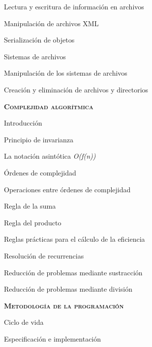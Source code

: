 \begin{longenum}
\begin{longenum}
\begin{longenum}
            \item Lectura y escritura de información en archivos
        \end{longenum}
        \item Manipulación de archivos XML
        \item Serialización de objetos
        \item Sistemas de archivos
        \begin{longenum}
            \item Manipulación de los sistemas de archivos
            \item Creación y eliminación de archivos y directorios
        \end{longenum}
    \end{longenum}
    \item \textbf{\textsc{Complejidad algorítmica}} \opcional\
    \begin{longenum}
        \item Introducción
        \item Principio de invarianza
        \item La notación asintótica \textit{O(f(n))}
        \item Órdenes de complejidad
        \item Operaciones entre órdenes de complejidad
        \begin{longenum}
            \item Regla de la suma
            \item Regla del producto
        \end{longenum}
        \item Reglas prácticas para el cálculo de la eficiencia
        \item Resolución de recurrencias
        \begin{longenum}
            \item Reducción de problemas mediante sustracción
            \item Reducción de problemas mediante división
        \end{longenum}
    \end{longenum}
    \item \textbf{\textsc{Metodología de la programación}} \ce{1a}\ \ce{1b}\ \ce{1c}\ \ce{3f}\ \ce{3g}\ \opcional\ \ra1\ \ra3\ \ra6\
    \begin{longenum}
        \item Ciclo de vida
        \item Especificación e implementación

\end{longenum}
\end{longenum}
